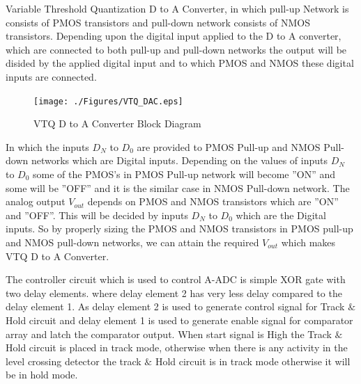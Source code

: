 \par
\hspace{1.2cm}Variable Threshold Quantization D to A Converter, in which pull-up Network is consists of PMOS transistors and pull-down network consists of NMOS transistors. Depending upon the digital input applied to the D to A converter, which are connected to both pull-up and pull-down networks the output will be disided by the applied digital input and to which PMOS and NMOS these digital inputs are connected.\\

\begin{figure}[ht]
\begin{center}
\texttt{[image: ./Figures/VTQ\_DAC.eps]}
\caption{VTQ D to A Converter Block Diagram}
\label{fig:VTQ_DAC}
\end{center}
\end{figure}

\par
\hspace{0.5cm}In which the inputs $D_N$ to $D_{0}$ are provided to PMOS Pull-up and NMOS Pull-down networks which are Digital inputs. Depending on the values of inputs $D_N$ to $D_{0}$ some of the PMOS’s in PMOS Pull-up network will become ”ON” and some will be ”OFF” and it is the similar case in NMOS Pull-down network. The analog output $V_{out}$ depends on PMOS and NMOS transistors which are ”ON” and ”OFF”. This will be decided by inputs $D_N$ to $D_{0}$ which are the Digital inputs. So by properly sizing the PMOS and NMOS transistors in PMOS pull-up and NMOS pull-down networks, we can attain the required $V_{out}$ which makes VTQ D to A Converter.\\




\par
\hspace{1.2cm} The controller circuit which is used to control A-ADC is simple XOR gate with two delay elements. where delay element 2 has very less delay compared to the delay  element 1. As delay element 2 is used to generate control signal for Track $\&$ Hold circuit and delay element 1 is used to generate enable signal for comparator array and latch the comparator output. When start signal is High the Track $\&$ Hold circuit is placed in track mode, otherwise when there is any activity in the level crossing detector the track $\&$ Hold circuit is in track mode otherwise it will be in hold mode.





